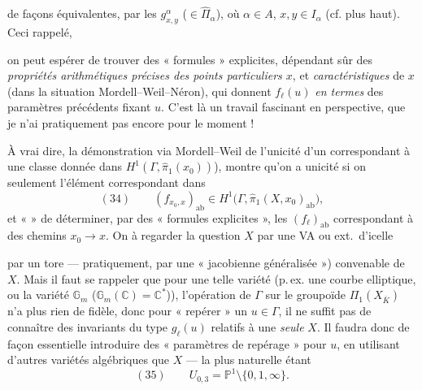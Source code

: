 \documentclass[11pt,a4paper]{article}
\begin{document}

 de façons équivalentes, par les $g^{\alpha}_{x,y}$ ($\in \hat{\Pi}_{\alpha}$), où $\alpha \in A$, $x, y \in I_{\alpha}$ (cf. plus haut). Ceci rappelé,

on peut espérer de trouver des « formules » explicites, dépendant  sûr des \textit{propriétés arithmétiques précises des points particuliers $x$}, et \textit{caractéristiques} de $x$ (dans la situation Mordell--Weil--Néron), qui donnent $f_{\ell}(u)$ \textit{en termes} des paramètres précédents fixant $u$. C'est là un travail fascinant en perspective, que je n'ai pratiquement pas  encore pour le moment !

À vrai dire, la démonstration via Mordell--Weil de l'unicité d'un   \struck{\ill{}} correspondant à une classe donnée dans $H^1(\Gamma, \hat{\pi}_1(x_0))$), montre qu'on a unicité  si on \struck{\ill{}}  seulement l'élément correspondant dans
\[
  (34) \qquad (f_{x_0, x})_{\mathrm{ab}} \in H^1\bigl(\Gamma, \hat{\pi}_1(X, x_0)_{\mathrm{ab}}\bigr),
\]
et \ill{} «  » \ill{} de déterminer, par des « formules explicites », les $(f_{\ell})_{\mathrm{ab}}$ correspondant à des chemins $x_0 \to x$. On  à regarder la \struck{\ill{}} question \ill{}  $X$ par une VA ou ext.\ d'icelle


par un tore --- pratiquement, par une « jacobienne généralisée ») convenable de $X$. Mais il faut se rappeler que pour une telle variété (p.\,ex. une courbe elliptique, ou la variété $\mathbb{G}_m$ ($\mathbb{G}_m(\mathbb{C}) = \mathbb{C}^{*}$)), l'opération de $\Gamma$ sur le groupoïde $\Pi_1(X_{\bar K})$ n'a plus rien de fidèle, donc pour « repérer » un $u \in \Gamma$, il ne suffit pas de connaître des invariants du type $g_{\ell}(u)$ relatifs à une \textit{seule}  $X$. Il faudra donc de façon essentielle introduire des « paramètres de repérage » pour $u$, en utilisant d'autres variétés algébriques que $X$ --- la plus naturelle étant
\[
  (35) \qquad U_{0,3} = \mathbb{P}^1 \setminus \{0, 1, \infty\}.
\]
\end{document}
